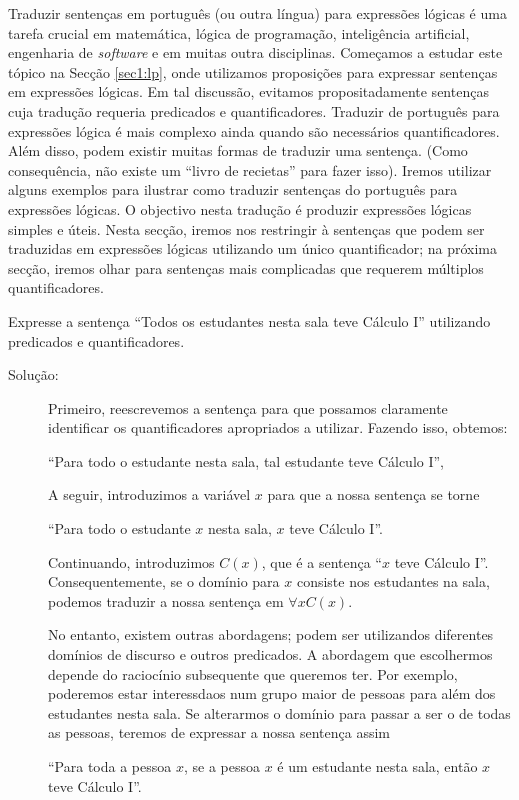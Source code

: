 Traduzir sentenças em português (ou outra língua) para expressões lógicas é
uma tarefa crucial em matemática, lógica de programação, inteligência
artificial, engenharia de \emph{software} e em muitas outra disciplinas.
Começamos a estudar este tópico na Secção \ref{sec1:lp}, onde utilizamos
proposições para expressar sentenças em expressões lógicas. Em tal discussão,
evitamos propositadamente sentenças cuja tradução requeria predicados e
quantificadores. Traduzir de português para expressões lógica é mais complexo
ainda quando são necessários quantificadores. Além disso, podem existir muitas
formas de traduzir uma sentença. (Como consequência, não existe um ``livro de
recietas'' para fazer isso). Iremos utilizar alguns exemplos para ilustrar como
traduzir sentenças do português para expressões lógicas. O objectivo nesta
tradução é produzir expressões lógicas simples e úteis. Nesta secção, iremos nos
restringir à sentenças que podem ser traduzidas em expressões lógicas utilizando
um único quantificador; na próxima secção, iremos olhar para sentenças mais
complicadas que requerem múltiplos quantificadores.

\begin{exmp}
\label{exem146}
Expresse a sentença ``Todos os estudantes nesta sala teve Cálculo I''
utilizando predicados e quantificadores.
\begin{description}
\item[Solução:]Primeiro, reescrevemos a sentença para que possamos claramente
identificar os quantificadores apropriados a utilizar. Fazendo isso, obtemos:
\begin{center}
``Para todo o estudante nesta sala, tal estudante teve Cálculo I'',
\end{center}
A seguir, introduzimos a variável $x$ para que a nossa sentença se torne
\begin{center}
``Para todo o estudante $x$ nesta sala, $x$ teve Cálculo I''.
\end{center}

Continuando, introduzimos $C(x)$, que é a sentença ``$x$ teve Cálculo I''.
Consequentemente, se o domínio para $x$ consiste nos estudantes na sala, podemos
traduzir a nossa sentença em $\forall xC(x)$.

No entanto, existem outras abordagens; podem ser utilizandos diferentes domínios
de discurso e outros predicados. A abordagem que escolhermos depende do
raciocínio subsequente que queremos ter. Por exemplo, poderemos estar
interessdaos num grupo maior de pessoas para além dos estudantes nesta sala. Se
alterarmos o domínio para passar a ser o de todas as pessoas, teremos de
expressar a nossa sentença assim

\begin{center}
``Para toda a pessoa $x$, se a pessoa $x$ é um estudante nesta sala, então $x$
teve Cálculo I''.
\end{center}
\end{description}
\end{exmp}



